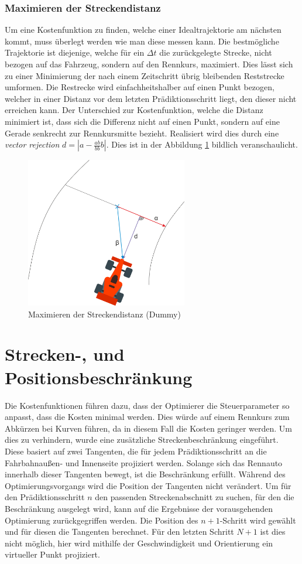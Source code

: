 \documentclass{like}
\begin{document}
\subsubsection*{Maximieren der Streckendistanz}
Um eine Kostenfunktion zu finden, welche einer Idealtrajektorie am nächsten kommt, muss überlegt werden wie man diese messen kann. Die bestmögliche Trajektorie ist diejenige, welche für ein $\Delta t$ die zurückgelegte Strecke, nicht bezogen auf das Fahrzeug, sondern auf den Rennkurs, maximiert. Dies lässt sich zu einer Minimierung der nach einem Zeitschritt übrig bleibenden Reststrecke umformen. Die Restrecke wird einfachheitshalber auf einen Punkt bezogen, welcher in einer Distanz vor dem letzten Prädiktionsschritt liegt, den dieser nicht erreichen kann. Der Unterschied zur Kostenfunktion, welche die Distanz minimiert ist, dass sich die Differenz nicht auf einen Punkt, sondern auf eine Gerade senkrecht zur Rennkursmitte bezieht.
Realisiert wird dies durch eine \emph{vector rejection}
$d = |a - \frac{ab}{bb}b| $. Dies ist in der Abbildung \ref{fig:maxDist} bildlich veranschaulicht.

\begin{figure}[ht!]
	\centering
	\includegraphics[width=200pt]{Abbildungen/vektorRejection.png}
	\caption{Maximieren der Streckendistanz (Dummy)}
	\label{fig:maxDist}
\end{figure}

\section{Strecken-, und Positionsbeschränkung}
\label{trackAndPosConstraint}
Die Kostenfunktionen führen dazu, dass der Optimierer die Steuerparameter so anpasst, dass die Kosten minimal werden. Dies würde auf einem Rennkurs zum Abkürzen bei Kurven führen, da in diesem Fall die Kosten geringer werden. Um dies zu verhindern, wurde eine zusätzliche Streckenbeschränkung eingeführt. Diese basiert auf zwei Tangenten, die für jedem Prädiktionsschritt an die Fahrbahnaußen- und Innenseite projiziert werden. Solange sich das Rennauto innerhalb dieser Tangenten bewegt, ist die Beschränkung erfüllt. Während des Optimierungsvorgangs wird die Position der Tangenten nicht verändert. Um für den Prädiktionsschritt \(n\) den passenden Streckenabschnitt zu suchen, für den die Beschränkung ausgelegt wird, kann auf die Ergebnisse der vorausgehenden Optimierung zurückgegriffen werden. Die Position des $n+1$-Schritt wird gewählt und für diesen die Tangenten berechnet. Für den letzten Schritt \(N +1\) ist dies nicht möglich, hier wird mithilfe der Geschwindigkeit und Orientierung ein virtueller Punkt projiziert.   
\end{document}
